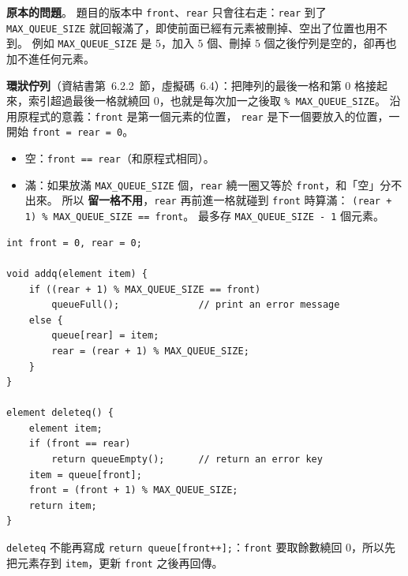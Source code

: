 \begin{pastsoln}
\textbf{原本的問題}。 題目的版本中 \texttt{front}、\texttt{rear} 只會往右走：\texttt{rear} 到了
\texttt{MAX\_QUEUE\_SIZE} 就回報滿了，即使前面已經有元素被刪掉、空出了位置也用不到。 例如
\texttt{MAX\_QUEUE\_SIZE} 是 $5$，加入 $5$ 個、刪掉 $5$ 個之後佇列是空的，卻再也加不進任何元素。

\textbf{環狀佇列}（資結書第~6.2.2~節，虛擬碼~6.4）：把陣列的最後一格和第 $0$ 格接起來，索引超過最後一格就繞回
$0$，也就是每次加一之後取 \texttt{\% MAX\_QUEUE\_SIZE}。 沿用原程式的意義：\texttt{front} 是第一個元素的位置，
\texttt{rear} 是下一個要放入的位置，一開始 \texttt{front = rear = 0}。
\begin{itemize}
\item 空：\texttt{front == rear}（和原程式相同）。
\item 滿：如果放滿 \texttt{MAX\_QUEUE\_SIZE} 個，\texttt{rear} 繞一圈又等於 \texttt{front}，和「空」分不出來。 所以
\textbf{留一格不用}，\texttt{rear} 再前進一格就碰到 \texttt{front} 時算滿：
\texttt{(rear + 1) \% MAX\_QUEUE\_SIZE == front}。 最多存 \texttt{MAX\_QUEUE\_SIZE - 1} 個元素。
\end{itemize}

\begin{verbatim}
int front = 0, rear = 0;

void addq(element item) {
    if ((rear + 1) % MAX_QUEUE_SIZE == front)
        queueFull();              // print an error message
    else {
        queue[rear] = item;
        rear = (rear + 1) % MAX_QUEUE_SIZE;
    }
}

element deleteq() {
    element item;
    if (front == rear)
        return queueEmpty();      // return an error key
    item = queue[front];
    front = (front + 1) % MAX_QUEUE_SIZE;
    return item;
}
\end{verbatim}

\texttt{deleteq} 不能再寫成 \texttt{return queue[front++];}：\texttt{front} 要取餘數繞回 $0$，所以先把元素存到
\texttt{item}，更新 \texttt{front} 之後再回傳。


\end{pastsoln}
